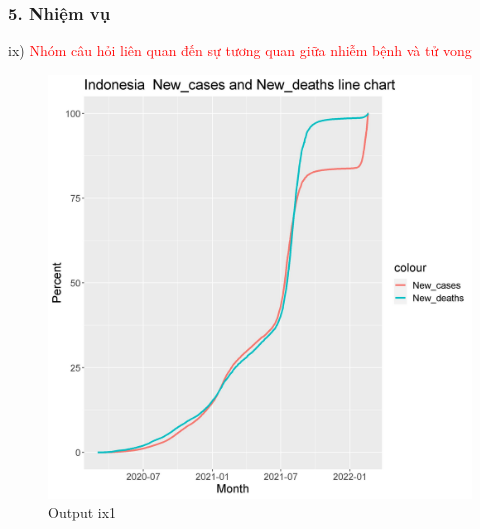 \documentclass[english,10pt,table]{beamer}
\begin{document}
\begin{frame}[fragile]
\frametitle{5.  Nhiệm vụ}
ix) \textcolor{red}{Nhóm câu hỏi liên quan đến sự tương quan giữa nhiễm bệnh và tử vong}\\
	\begin{figure}[h!]
	\begin{center}
		    \includegraphics[scale = 0.3]{Images/IX/ix1Indonesia.jpeg}
		     \caption{Output ix1}
		\end{center}
		\end{figure}
\end{frame}
\end{document}
